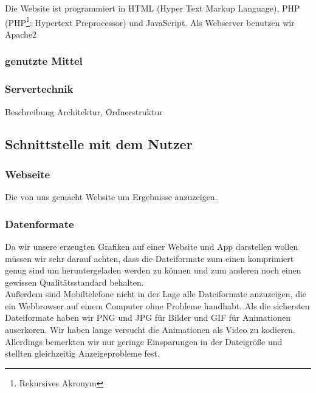 Die Website ist programmiert in HTML (Hyper Text Markup Language), PHP (PHP\footnote{Rekursives Akronym}: Hypertext Preprocessor) und JavaScript.
Als Webserver benutzen wir Apache2 \cite{php} \cite{apache} \\

\subsubsection{genutzte Mittel} %

\subsubsection{Servertechnik} %
Beschreibung Architektur, Ordnerstruktur

\subsection{Schnittstelle mit dem Nutzer} %

\subsubsection{Webseite} %
Die von uns gemacht Website um Ergebnisse anzuzeigen.

\subsubsection{Datenformate} %
Da wir unsere erzeugten Grafiken auf einer Website und App darstellen wollen müssen wir sehr darauf achten,
dass die Dateiformate zum einen komprimiert genug sind um heruntergeladen werden zu können und zum anderen noch einen gewissen Qualitätsstandard behalten.\\
Außerdem sind Mobiltelefone nicht in der Lage alle Dateiformate anzuzeigen,
die ein Webbrowser auf einem Computer ohne Probleme handhabt.
Als die sichersten Dateiformate haben wir PNG und JPG für Bilder und GIF für Animationen auserkoren.
Wir haben lange versucht die Animationen als Video zu kodieren.
Allerdings bemerkten wir nur geringe Einsparungen in der Dateigröße und stellten gleichzeitig Anzeigeprobleme fest.

